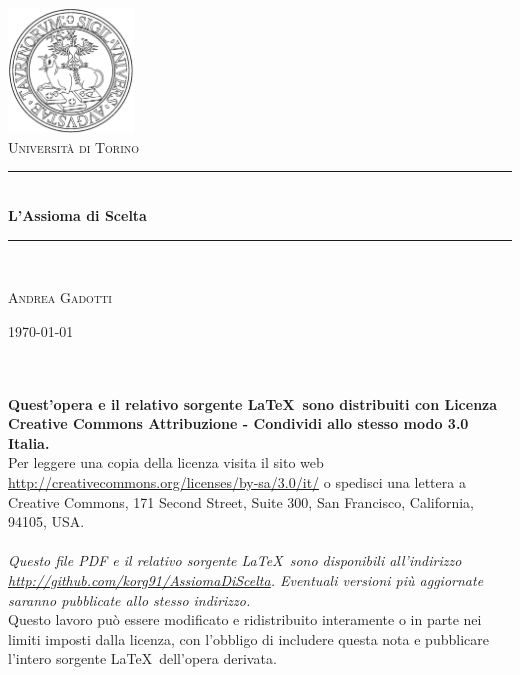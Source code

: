 \documentclass[12pt,a4paper]{report}
\theoremstyle{definition}
\theoremstyle{num.custom-title}
\newcommand{\HRule}{\rule{\linewidth}{0.5mm}} %
\begin{document}
\begin{titlepage}
\begin{center}

\includegraphics[width=0.25\textwidth]{./logo.png}~\\[1cm]

\textsc{\LARGE Università di Torino}\\[1.5cm]


\HRule \\[0.4cm]
{ \huge \bfseries L'Assioma di Scelta \\[0.4cm] }

\HRule \\[1.5cm]

\begin{minipage}{0.4\textwidth}
\begin{center} \large
\textsc{Andrea Gadotti}
\end{center}
\end{minipage}


\vfill

{\large \today}

\end{center}
\end{titlepage}






\null
\vfill
\noindent \ccbysa  \\
\\
\textbf{Quest'opera e il relativo sorgente \LaTeX \ sono distribuiti con Licenza Creative Commons Attribuzione - Condividi allo stesso modo 3.0 Italia.} \\
Per leggere una copia della licenza visita il sito web \url{http://creativecommons.org/licenses/by-sa/3.0/it/} o spedisci una lettera a Creative Commons, 171 Second
Street, Suite 300, San Francisco, California, 94105, USA.\\
\\
\emph{Questo file PDF e il relativo sorgente \LaTeX \ sono disponibili all'indirizzo\\
\emph{\url{http://github.com/korg91/AssiomaDiScelta}}. Eventuali versioni più aggiornate saranno pubblicate allo stesso indirizzo.}\\
Questo lavoro può essere modificato e ridistribuito interamente o in parte nei limiti imposti dalla licenza, con l'obbligo di includere questa nota e pubblicare l'intero sorgente \LaTeX \ dell'opera derivata.
\end{document}
